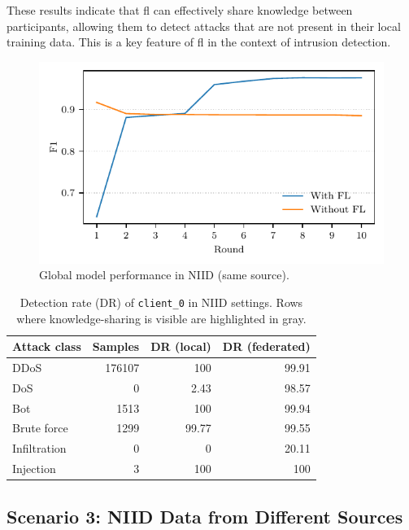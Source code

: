 These results indicate that \gls{fl} can effectively share knowledge between participants, allowing them to detect attacks that are not present in their local training data.
This is a key feature of \gls{fl} in the context of intrusion detection.

\begin{figure}
    \centering
    \includegraphics{figures/niid.pdf}
    \caption{Global model performance in NIID (same source).}
    \label{fig:niid}
\end{figure}

\begin{table}
    \centering
    \caption{Detection rate (DR) of \texttt{client\_0} in NIID settings. Rows where knowledge-sharing is visible are highlighted in gray.}
    \label{tbl:niidclient}
    \begin{tabular}{l|rrr}
        \toprule
        \textbf{Attack class} & \textbf{Samples} & \textbf{DR (local)} & \textbf{DR (federated)} \\
        \midrule
        DDoS & 176107 & 100 & 99.91 \\
        \rowcolor{lightgray} DoS & 0 & 2.43 & 98.57 \\
        Bot & 1513 & 100 & 99.94 \\
        Brute force & 1299 & 99.77 & 99.55 \\
        \rowcolor{lightgray} Infiltration & 0 & 0 & 20.11 \\
        Injection & 3 & 100 & 100 \\
        \bottomrule
    \end{tabular}
\end{table}



\subsection{Scenario 3: NIID Data from Different Sources\label{sec:demo.heterogeneous}}


